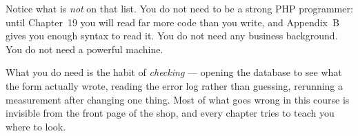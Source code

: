 \begin{conceptbox}
Notice what is \emph{not} on that list. You do not need to be a strong PHP
programmer: until Chapter~19 you will read far more code than you write, and
Appendix~B gives you enough syntax to read it. You do not need any business
background. You do not need a powerful machine.

\smallskip
What you do need is the habit of \emph{checking} --- opening the database to
see what the form actually wrote, reading the error log rather than guessing,
rerunning a measurement after changing one thing. Most of what goes wrong in
this course is invisible from the front page of the shop, and every chapter
tries to teach you where to look.
\end{conceptbox}

\newpage
\tableofcontents
\newpage
\listoffigures
\newpage

